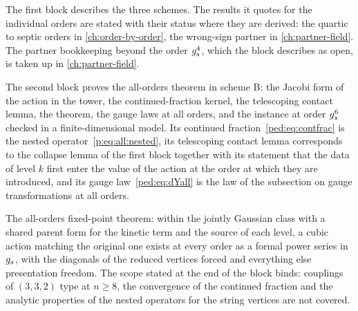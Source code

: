 The first block describes the three schemes.
The results it quotes for the individual orders are stated with their status where they are derived: the quartic to septic orders in \cref{ch:order-by-order}, the wrong-sign partner in \cref{ch:partner-field}.
The partner bookkeeping beyond the order $g_s^4$, which the block describes as open, is taken up in \cref{ch:partner-field}.



\medskip
The second block proves the all-orders theorem in scheme B: the Jacobi form of the action in the tower, the continued-fraction kernel, the telescoping contact lemma, the theorem, the gauge laws at all orders, and the instance at order $g_s^6$ checked in a finite-dimensional model.
Its continued fraction~\eqref{ped:eq:contfrac} is the nested operator~\eqref{p:eq:all:nested}, its telescoping contact lemma corresponds to the collapse lemma of the first block together with its statement that the data of level $k$ first enter the value of the action at the order at which they are introduced, and its gauge law~\eqref{ped:eq:dYall} is the law of the subsection on gauge transformations at all orders.

\noindent{} The all-orders fixed-point theorem: within the jointly Gaussian class with a shared parent form for the kinetic term and the source of each level, a cubic action matching the original one exists at every order as a formal power series in $g_s$, with the diagonals of the reduced vertices forced and everything else presentation freedom.
The scope stated at the end of the block binds: couplings of $(3, 3, 2)$ type at $n \ge 8$, the convergence of the continued fraction and the analytic properties of the nested operators for the string vertices are not covered.


